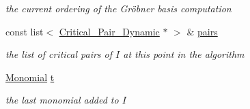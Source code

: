 \begin{DoxyCompactItemize}
\begin{DoxyCompactList}\small\item\em the current ordering of the Gr\"{o}bner basis computation \end{DoxyCompactList}\item 
\mbox{\label{group___g_b_computation_a9254ab1c3c33afeb73786f3a10719e3f}} 
const list$<$ \hyperlink{group___g_b_computation_class_critical___pair___dynamic}{Critical\+\_\+\+Pair\+\_\+\+Dynamic} $\ast$ $>$ \& \hyperlink{group___g_b_computation_a9254ab1c3c33afeb73786f3a10719e3f}{pairs}
\begin{DoxyCompactList}\small\item\em the list of critical pairs of $I$ at this point in the algorithm \end{DoxyCompactList}\item 
\mbox{\label{group___g_b_computation_abbb33a00772961f2fa9d851dae8a2e07}} 
\hyperlink{group__polygroup_class_monomial}{Monomial} \hyperlink{group___g_b_computation_abbb33a00772961f2fa9d851dae8a2e07}{t}
\begin{DoxyCompactList}\small\item\em the last monomial added to $I$ \end{DoxyCompactList}\end{DoxyCompactItemize}


